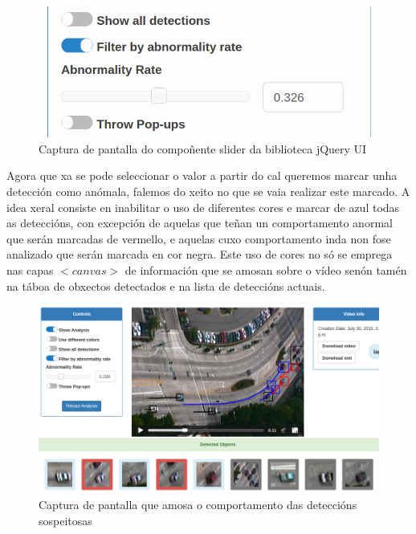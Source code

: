     \begin{figure}[htp]
    \begin{center}
        \includegraphics[scale=0.5]{figures/sliderCapture.png}
        \caption{Captura de pantalla do compoñente slider da biblioteca jQuery UI}
    \label{fig:sliderCapture}
    \end{center}
    \end{figure}
    
    Agora que xa se pode seleccionar o valor a partir do cal queremos marcar unha detección como
    anómala, falemos do xeito no que se vaia realizar este marcado. A idea xeral consiste en 
    inabilitar o uso de diferentes cores e marcar de azul todas as deteccións, con excepción de 
    aquelas que teñan un comportamento anormal que serán marcadas de vermello, e aquelas cuxo 
    comportamento inda non fose analizado que serán marcada en cor negra. Este uso de cores no só
    se emprega nas capas $<canvas>$ de información que se amosan sobre o vídeo senón tamén na táboa
    de obxectos detectados e na lista de deteccións actuais.

    \begin{figure}[htp]
    \begin{center}
        \includegraphics[scale=0.4]{figures/suspiciousDetections.png}
        \caption{Captura de pantalla que amosa o comportamento das deteccións sospeitosas}
    \label{fig:suspiciousDetections}
    \end{center}
    \end{figure}
    
